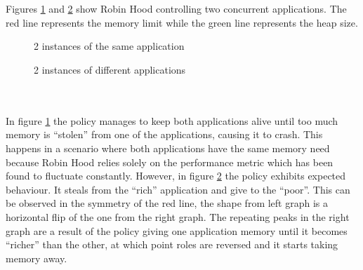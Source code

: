 \documentclass{l4proj}
\begin{document}
\\\\
Figures \ref{robin_eq} and \ref{robin_df} show Robin Hood controlling two concurrent applications. The red line represents the memory limit while the green line represents the heap size.
\begin{figure}[!ht]
\caption{2 instances of the same application}
\label{robin_eq}
\end{figure}
\begin{figure}[!ht]
\caption{2 instances of different applications}
\label{robin_df}
\end{figure}
\\\\
In figure \ref{robin_eq} the policy manages to keep both applications alive until too much memory is ``stolen'' from one of the applications, causing it to crash. This happens in a scenario where both applications have the same memory need because Robin Hood relies solely on the performance metric which has been found to fluctuate constantly. However, in figure \ref{robin_df} the policy exhibits expected behaviour. It steals from the ``rich'' application and give to the ``poor''. This can be observed in the symmetry of the red line, the shape from left graph is a horizontal flip of the one from the right graph. The repeating peaks in the right graph are a result of the policy giving one application memory until it becomes ``richer'' than the other, at which point roles are reversed and it starts taking memory away. 
\end{document}
